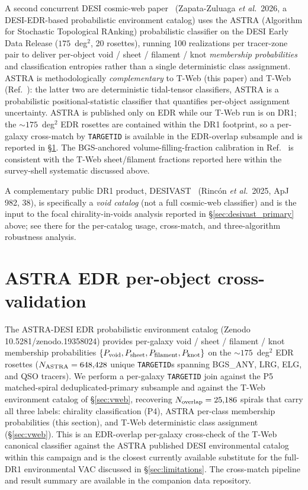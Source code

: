 \documentclass[twocolumn,linenumbers]{aastex702}
\begin{document}
A second concurrent DESI cosmic-web paper~\cite{ASTRADESI2026} (Zapata-Zuluaga
\textit{et al.}\ 2026, a DESI-EDR-based probabilistic environment catalog) uses
the ASTRA (Algorithm for Stochastic Topological RAnking) probabilistic
classifier on the DESI Early Data Release ($175$~deg$^{2}$, 20
rosettes), running 100 realizations per tracer-zone pair to deliver
per-object void / sheet / filament / knot \emph{membership
probabilities} and classification entropies rather than a single
deterministic class assignment. ASTRA is methodologically
\emph{complementary} to T-Web (this paper) and T-Web
(Ref.~\cite{TWebDESI2026}): the latter two are deterministic
tidal-tensor classifiers, ASTRA is a probabilistic positional-statistic
classifier that quantifies per-object assignment uncertainty.
ASTRA is published only on EDR while our T-Web run is on DR1; the
$\sim\!175$~deg$^{2}$ EDR rosettes are contained within the DR1
footprint, so a per-galaxy cross-match by \texttt{TARGETID} is
available in the EDR-overlap subsample and is reported in
\S\ref{sec:astra_per_object}. The BGS-anchored volume-filling-fraction
calibration in Ref.~\cite{ASTRADESI2026} is consistent with the T-Web
sheet/filament fractions reported here within the survey-shell
systematic discussed above.

A complementary public DR1 product, DESIVAST~\cite{DESIVAST2025}
(Rinc\'on \textit{et al.}\ 2025, ApJ 982, 38), is specifically a
\emph{void catalog} (not a full cosmic-web classifier) and is the
input to the focal chirality-in-voids analysis reported in
\S\ref{sec:desivast_primary} above; see there for the per-catalog
usage, cross-match, and three-algorithm robustness analysis.

\section{ASTRA EDR per-object
cross-validation}\label{sec:astra_per_object}

The ASTRA-DESI EDR probabilistic environment catalog
\cite{ASTRADESI2026} (Zenodo 10.5281/zenodo.19358024) provides
per-galaxy void / sheet / filament / knot membership probabilities
$\{P_{\rm void}, P_{\rm sheet}, P_{\rm filament}, P_{\rm knot}\}$ on
the $\sim\!175$~deg$^{2}$ EDR rosettes ($N_{\rm ASTRA} = 648{,}428$
unique \texttt{TARGETID}s spanning BGS\_ANY, LRG, ELG, and QSO
tracers). We perform a per-galaxy \texttt{TARGETID} join against the
P5 matched-spiral deduplicated-primary subsample and against the T-Web
environment catalog of \S\ref{sec:vweb}, recovering
$N_{\rm overlap} = 25{,}186$ spirals that carry all three labels:
chirality classification (P4), ASTRA per-class membership probabilities
(this section), and T-Web deterministic class assignment
(\S\ref{sec:vweb}). This is an EDR-overlap per-galaxy cross-check of
the T-Web canonical classifier against the ASTRA published DESI
environmental catalog within this campaign and is the closest currently
available substitute for the full-DR1 environmental VAC discussed in
\S\ref{sec:limitations}. The cross-match pipeline and result summary are available in the companion data repository.
\end{document}
